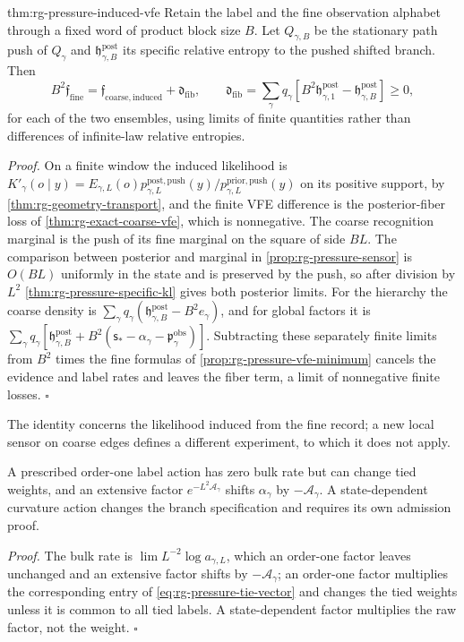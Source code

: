 {thm:rg-pressure-induced-vfe}
Retain the label and the fine observation alphabet through a fixed word of
product block size $B$. Let $Q_{\gamma,B}$ be the stationary path push of
$Q_\gamma$ and $\mathfrak h^{\mathrm{post}}_{\gamma,B}$ its specific relative
entropy to the pushed shifted branch. Then
\begin{equation}
 B^2\mathfrak f_{\mathrm{fine}}
   =\mathfrak f_{\mathrm{coarse,induced}}+\mathfrak d_{\mathrm{fib}},\qquad
 \mathfrak d_{\mathrm{fib}}=\sum_\gamma q_\gamma
 \left[B^2\mathfrak h^{\mathrm{post}}_{\gamma,1}
             -\mathfrak h^{\mathrm{post}}_{\gamma,B}\right]\geq0,
 \label{eq:rg-pressure-induced-vfe}
\end{equation}
for each of the two ensembles, using limits of finite quantities rather than
differences of infinite-law relative entropies. 

\noindent\emph{Proof.}
On a finite window the induced likelihood is
$K'_\gamma(o\mid y)=E_{\gamma,L}(o)
 p_{\gamma,L}^{\mathrm{post,push}}(y)/p_{\gamma,L}^{\mathrm{prior,push}}(y)$ on
its positive support, by \cref{thm:rg-geometry-transport}, and the finite VFE
difference is the posterior-fiber loss of \cref{thm:rg-exact-coarse-vfe},
which is nonnegative. The coarse recognition marginal is the push of its fine
marginal on the square of side $BL$. The comparison between posterior and
marginal in \cref{prop:rg-pressure-sensor} is $O(BL)$ uniformly in the state
and is preserved by the push, so after division by $L^2$
\cref{thm:rg-pressure-specific-kl} gives both posterior limits. For the
hierarchy the coarse density is
$\sum_\gamma q_\gamma(\mathfrak h^{\mathrm{post}}_{\gamma,B}-B^2e_\gamma)$, and
for global factors it is
$\sum_\gamma q_\gamma[\mathfrak h^{\mathrm{post}}_{\gamma,B}
 +B^2(\mathsf s_*-\alpha_\gamma-\mathfrak p_\gamma^{\mathrm{obs}})]$.
Subtracting these separately finite limits from $B^2$ times the fine formulas
of \cref{prop:rg-pressure-vfe-minimum} cancels the evidence and label rates
and leaves the fiber term, a limit of nonnegative finite losses. $\square$

The identity concerns the likelihood induced from the fine record; a new
local sensor on coarse edges defines a different experiment, to which it does
not apply.

A prescribed order-one label action has zero bulk rate but can change tied
weights, and an
extensive factor $e^{-L^2\mathscr A_\gamma}$ shifts $\alpha_\gamma$ by
$-\mathscr A_\gamma$. A state-dependent curvature action changes the branch
specification and requires its own admission proof. 

\noindent\emph{Proof.}
The bulk rate is $\lim L^{-2}\log a_{\gamma,L}$, which an order-one factor
leaves unchanged and an extensive factor shifts by $-\mathscr A_\gamma$; an
order-one factor multiplies the corresponding entry of
\cref{eq:rg-pressure-tie-vector} and changes the tied weights unless it is
common to all tied labels. A state-dependent factor multiplies the raw
factor, not the weight. $\square$
